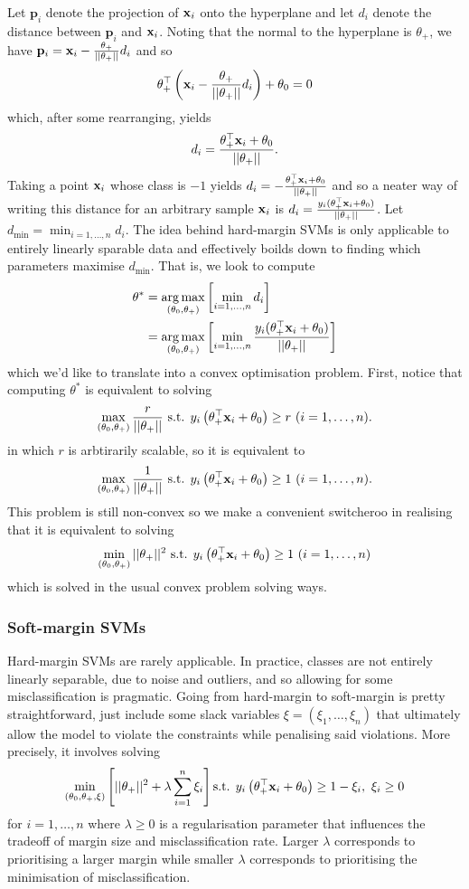\documentclass[11pt]{article}
\begin{document}
\noindent Let $\mathbf{p}_i$ denote the projection of $\mathbf{x}_i$ onto the hyperplane and let $d_i$ denote the distance between $\mathbf{p}_i$ and $\mathbf{x}_i$. Noting that the normal to the hyperplane is $\theta_+$, we have $\mathbf{p}_i=\mathbf{x}_i-\frac{\theta_+}{||\theta_+||}d_i$ and so
$$
\theta_+^\top \left(\mathbf{x}_i-\frac{\theta_+}{||\theta_+||}d_i\right)+\theta_0
=
0
$$
which, after some rearranging, yields
$$
d_i
=
\frac{\theta_+^\top \mathbf{x}_i+\theta_0}{||\theta_+||}.
$$
Taking a point $\mathbf{x}_i$ whose class is $-1$ yields $d_i=-\frac{\theta_+^\top \mathbf{x}_i+\theta_0}{||\theta_+||}$ and so a neater way of writing this distance for an arbitrary sample $\mathbf{x}_i$ is $d_i=\frac{y_i(\theta_+^\top \mathbf{x}_i+\theta_0)}{||\theta_+||}$. Let $d_{\text{min}}=\min_{i=1,\dots,n}d_i$. The idea behind hard-margin SVMs is only applicable to entirely linearly sparable data and effectively boilds down to finding which parameters maximise $d_{\text{min}}$. That is, we look to compute
\begin{align*}
    \theta^{*}
    &=
    \operatorname*{arg\,max}_{(\theta_0,\theta_+)}\left[\min_{i=1,\dots,n}d_i\right]\\
    &=
    \operatorname*{arg\,max}_{(\theta_0,\theta_+)}\left[\min_{i=1,\dots,n}\frac{y_i(\theta_+^\top \mathbf{x}_i+\theta_0)}{||\theta_+||}\right]\\
\end{align*}
which we'd like to translate into a convex optimisation problem. First, notice that computing $\theta^{*}$ is equivalent to solving
$$
\max_{(\theta_0,\theta_+)}\frac{r}{||\theta_+||}\text{ s.t. } y_i\left(\theta_+^\top \mathbf{x}_i+\theta_0\right)\geq r\text{ } (i=1,\dots,n).
$$
in which $r$ is arbtirarily scalable, so it is equivalent to
$$
\max_{(\theta_0,\theta_+)}\frac{1}{||\theta_+||}\text{ s.t. } y_i\left(\theta_+^\top \mathbf{x}_i+\theta_0\right)\geq 1\text{ } (i=1,\dots,n).
$$
This problem is still non-convex so we make a convenient switcheroo in realising that it is equivalent to solving
$$
\min_{(\theta_0,\theta_+)}||\theta_+||^2\text{ s.t. } y_i\left(\theta_+^\top \mathbf{x}_i+\theta_0\right)\geq 1\text{ } (i=1,\dots,n)
$$
which is solved in the usual convex problem solving ways.

\subsubsection{Soft-margin SVMs}

Hard-margin SVMs are rarely applicable. In practice, classes are not entirely linearly separable, due to noise and outliers, and so allowing for some misclassification is pragmatic. Going from hard-margin to soft-margin is pretty straightforward, just include some slack variables $\xi=(\xi_1,\dots,\xi_n)$ that ultimately allow the model to violate the constraints while penalising said violations. More precisely, it involves solving
$$
\min_{(\theta_0,\theta_+,\xi)}\left[||\theta_+||^2+\lambda\sum_{i=1}^n\xi_i\right]\text{s.t. } y_i\left(\theta_+^\top \mathbf{x}_i+\theta_0\right)\geq 1-\xi_i,\text{ }\xi_i\geq0
$$
for $i=1,\dots,n$ where $\lambda\geq0$ is a regularisation parameter that influences the tradeoff of margin size and misclassification rate. Larger $\lambda$ corresponds to prioritising a larger margin while smaller $\lambda$ corresponds to prioritising the minimisation of misclassification.
\end{document}
